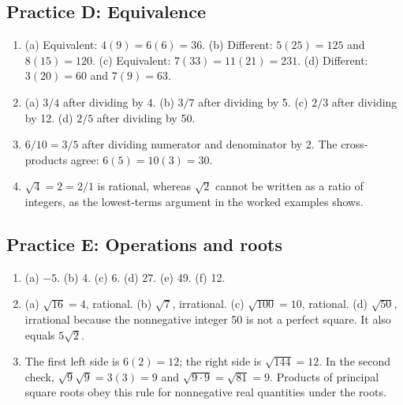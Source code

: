 \documentclass[12pt,letterpaper]{article}
\begin{document}
\subsection*{Practice D: Equivalence}
\begin{enumerate}[label=D\arabic*.,leftmargin=2.5em,itemsep=10pt]
\item (a) Equivalent: $4(9)=6(6)=36$. (b) Different: $5(25)=125$ and $8(15)=120$. (c) Equivalent: $7(33)=11(21)=231$. (d) Different: $3(20)=60$ and $7(9)=63$.
\item (a) $3/4$ after dividing by 4. (b) $3/7$ after dividing by 5. (c) $2/3$ after dividing by 12. (d) $2/5$ after dividing by 50.
\item $6/10=3/5$ after dividing numerator and denominator by 2. The cross-products agree: $6(5)=10(3)=30$.
\item $\sqrt4=2=2/1$ is rational, whereas $\sqrt2$ cannot be written as a ratio of integers, as the lowest-terms argument in the worked examples shows.
\end{enumerate}

\subsection*{Practice E: Operations and roots}
\begin{enumerate}[label=E\arabic*.,leftmargin=2.5em,itemsep=10pt]
\item (a) $-5$. (b) 4. (c) 6. (d) 27. (e) 49. (f) 12.
\item (a) $\sqrt{16}=4$, rational. (b) $\sqrt7$, irrational. (c) $\sqrt{100}=10$, rational. (d) $\sqrt{50}$, irrational because the nonnegative integer 50 is not a perfect square. It also equals $5\sqrt2$.
\item The first left side is $6(2)=12$; the right side is $\sqrt{144}=12$. In the second check, $\sqrt9\sqrt9=3(3)=9$ and $\sqrt{9\cdot9}=\sqrt{81}=9$. Products of principal square roots obey this rule for nonnegative real quantities under the roots.
\end{enumerate}
\end{document}
